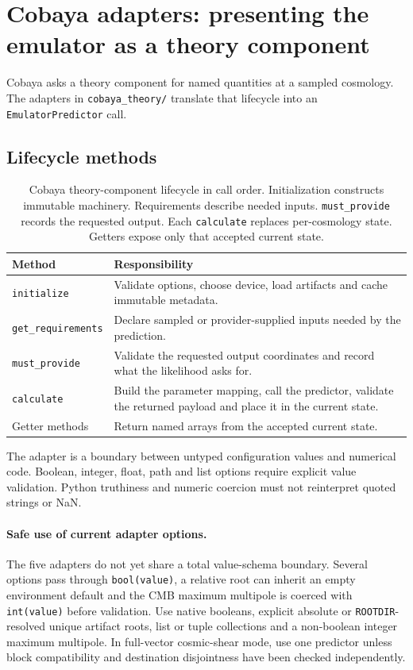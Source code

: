 \documentclass[10pt,aps,prd,twocolumn,nofootinbib]{revtex4-2}
\newcommand{\code}[1]{\texttt{#1}}
\begin{document}
\section{Cobaya adapters: presenting the emulator as a theory component}
\label{chap:adapters}

Cobaya asks a theory component for named quantities at a sampled cosmology.
The adapters in \code{cobaya\_theory/} translate that lifecycle into an
\code{EmulatorPredictor} call.

\subsection{Lifecycle methods}

\begin{table}[t]
\centering
\begin{tabular}{p{}p{}}
\toprule
Method & Responsibility \\
\midrule
\code{initialize} & Validate options, choose device, load artifacts and cache
immutable metadata.  \\
\code{get\_requirements} & Declare sampled or provider-supplied inputs needed
by the prediction.  \\
\code{must\_provide} & Validate the requested output coordinates and record
what the likelihood asks for.  \\
\code{calculate} & Build the parameter mapping, call the predictor, validate
the returned payload and place it in the current state.  \\
Getter methods & Return named arrays from the accepted current state.  \\
\bottomrule
\end{tabular}
\caption{Cobaya theory-component lifecycle in call order.  Initialization
constructs immutable machinery.  Requirements describe needed inputs.
\code{must\_provide} records the requested output.  Each \code{calculate}
replaces per-cosmology state.  Getters expose only that accepted current state.}
\label{tab:cobaya-lifecycle}
\end{table}

The adapter is a boundary between untyped configuration values and numerical
code.  Boolean, integer, float, path and list options require explicit value
validation.  Python truthiness and numeric coercion must not reinterpret quoted
strings or NaN.

\paragraph{Safe use of current adapter options.}
The five adapters do not yet share a total value-schema boundary.  Several
options pass through \code{bool(value)}, a relative root can inherit an empty
environment default and the CMB maximum multipole is coerced with
\code{int(value)} before validation.  Use native booleans, explicit absolute or
\code{ROOTDIR}-resolved unique artifact roots, list or tuple collections and a
non-boolean integer maximum multipole.  In full-vector cosmic-shear mode, use
one predictor unless block compatibility and destination disjointness have
been checked independently.
\end{document}
